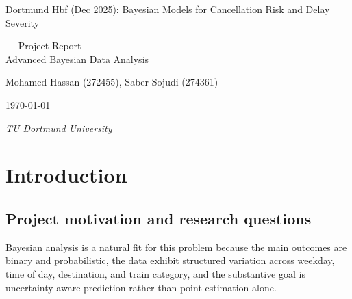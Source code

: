 \documentclass[12pt]{article}
\begin{document}
\begin{titlepage}
        \centering %
        \vspace*{\baselineskip} %
        
        {\huge Dortmund Hbf (Dec 2025): Bayesian Models for Cancellation Risk and Delay Severity}\\[0.2\baselineskip] %
        
        
        \vspace*{\baselineskip}
        
        {\Large --- Project Report ---\\
          Advanced Bayesian Data Analysis\\[\baselineskip]} %
        \vspace*{\baselineskip}
        
        {\LARGE Mohamed Hassan (272455), Saber Sojudi (274361)\\[\baselineskip]} %
        
        \vspace*{\baselineskip}

        \vfill
        
        \today \par %
        
        \vspace*{\baselineskip}

        {\itshape TU Dortmund University\par} %
    \end{titlepage}

\clearpage
\tableofcontents
\clearpage

\section{Introduction}
\subsection{Project motivation and research questions}

Bayesian analysis is a natural fit for this problem because the main outcomes are binary and probabilistic, the data exhibit structured variation across weekday, time of day, destination, and train category, and the substantive goal is uncertainty-aware prediction rather than point estimation alone.
\end{document}
